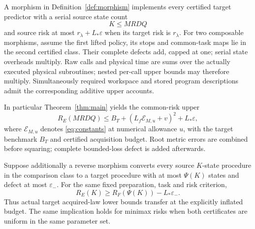 \begin{theorem}\label{thm:morphism}
A morphism in Definition~\ref{def:morphism} implements every certified target predictor with a serial source state count
\begin{equation}\label{eq:tuple}
 K\le MRDQ
\end{equation}
and source risk at most $r_\lambda+L_*\varepsilon$ when its target risk is $r_\lambda$. For two composable morphisms, assume the first lifted policy, its stops and common-task maps lie in the second certified class. Their complete defects add, capped at one; serial state overheads multiply. Raw calls and physical time are sums over the actually executed physical subroutines; nested per-call upper bounds may therefore multiply. Simultaneously required workspace and stored program descriptions admit the corresponding additive upper accounts.

In particular Theorem~\ref{thm:main} yields the common-risk upper
\begin{equation}\label{eq:composedrisk}
 R_E(MRDQ)\le B_T+(L_f\mathcal E_{M,u}+v)^2+L_*\varepsilon,
\end{equation}
where $\mathcal E_{M,u}$ denotes \eqref{eq:constants} at numerical allowance $u$, with the target benchmark $B_T$ and certified acquisition budget. Root metric errors are combined before squaring; complete bounded-loss defect is added afterwards.

Suppose additionally a reverse morphism converts every source $K$-state procedure in the comparison class to a target procedure with at most $\Psi(K)$ states and defect at most $\varepsilon_-$. For the same fixed preparation, task and risk criterion,
\begin{equation}\label{eq:reverse}
 R_E(K)\ge R_F(\Psi(K))-L_*\varepsilon_-.
\end{equation}
Thus actual target acquired-law lower bounds transfer at the explicitly inflated budget. The same implication holds for minimax risks when both certificates are uniform in the same parameter set.
\end{theorem}
